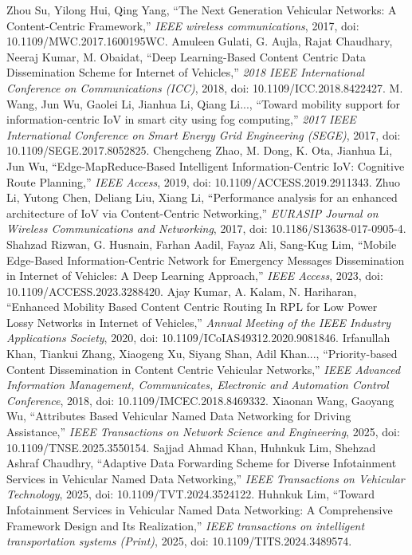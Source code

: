 


Zhou Su, Yilong Hui, Qing Yang, ``The Next Generation Vehicular Networks: A Content-Centric Framework,'' \textit{IEEE wireless communications}, 2017, doi: 10.1109/MWC.2017.1600195WC.
Amuleen Gulati, G. Aujla, Rajat Chaudhary, Neeraj Kumar, M. Obaidat, ``Deep Learning-Based Content Centric Data Dissemination Scheme for Internet of Vehicles,'' \textit{2018 IEEE International Conference on Communications (ICC)}, 2018, doi: 10.1109/ICC.2018.8422427.
M. Wang, Jun Wu, Gaolei Li, Jianhua Li, Qiang Li..., ``Toward mobility support for information-centric IoV in smart city using fog computing,'' \textit{2017 IEEE International Conference on Smart Energy Grid Engineering (SEGE)}, 2017, doi: 10.1109/SEGE.2017.8052825.
Chengcheng Zhao, M. Dong, K. Ota, Jianhua Li, Jun Wu, ``Edge-MapReduce-Based Intelligent Information-Centric IoV: Cognitive Route Planning,'' \textit{IEEE Access}, 2019, doi: 10.1109/ACCESS.2019.2911343.
Zhuo Li, Yutong Chen, Deliang Liu, Xiang Li, ``Performance analysis for an enhanced architecture of IoV via Content-Centric Networking,'' \textit{EURASIP Journal on Wireless Communications and Networking}, 2017, doi: 10.1186/S13638-017-0905-4.
Shahzad Rizwan, G. Husnain, Farhan Aadil, Fayaz Ali, Sang-Kug Lim, ``Mobile Edge-Based Information-Centric Network for Emergency Messages Dissemination in Internet of Vehicles: A Deep Learning Approach,'' \textit{IEEE Access}, 2023, doi: 10.1109/ACCESS.2023.3288420.
Ajay Kumar, A. Kalam, N. Hariharan, ``Enhanced Mobility Based Content Centric Routing In RPL for Low Power Lossy Networks in Internet of Vehicles,'' \textit{Annual Meeting of the IEEE Industry Applications Society}, 2020, doi: 10.1109/ICoIAS49312.2020.9081846.
Irfanullah Khan, Tiankui Zhang, Xiaogeng Xu, Siyang Shan, Adil Khan..., ``Priority-based Content Dissemination in Content Centric Vehicular Networks,'' \textit{IEEE Advanced Information Management, Communicates, Electronic and Automation Control Conference}, 2018, doi: 10.1109/IMCEC.2018.8469332.
Xiaonan Wang, Gaoyang Wu, ``Attributes Based Vehicular Named Data Networking for Driving Assistance,'' \textit{IEEE Transactions on Network Science and Engineering}, 2025, doi: 10.1109/TNSE.2025.3550154.
Sajjad Ahmad Khan, Huhnkuk Lim, Shehzad Ashraf Chaudhry, ``Adaptive Data Forwarding Scheme for Diverse Infotainment Services in Vehicular Named Data Networking,'' \textit{IEEE Transactions on Vehicular Technology}, 2025, doi: 10.1109/TVT.2024.3524122.
Huhnkuk Lim, ``Toward Infotainment Services in Vehicular Named Data Networking: A Comprehensive Framework Design and Its Realization,'' \textit{IEEE transactions on intelligent transportation systems (Print)}, 2025, doi: 10.1109/TITS.2024.3489574.

